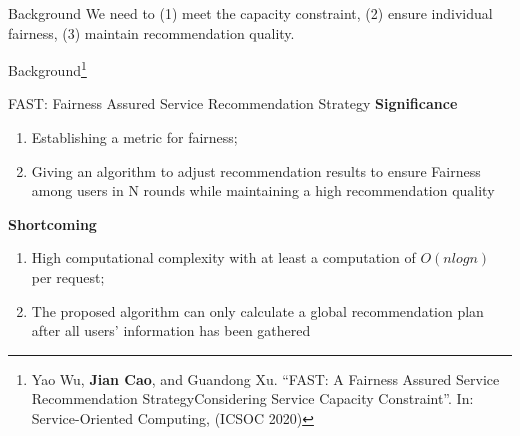 \begin{frame}{Background}
We need to (1) meet the capacity constraint, (2) ensure individual fairness, (3) maintain recommendation quality.

\end{frame}







\begin{frame}{Background\footnote{Yao Wu, \textbf{Jian Cao}, and Guandong Xu. “FAST: A Fairness Assured Service Recommendation StrategyConsidering Service Capacity Constraint”. In: Service-Oriented Computing, (ICSOC 2020)}}

\begin{block}{FAST: Fairness Assured Service Recommendation Strategy}
\textbf{Significance}
  \begin{enumerate}
      \item Establishing a metric for fairness;
      \item Giving an algorithm to adjust recommendation results to ensure Fairness among users in N rounds while maintaining a high recommendation quality
  \end{enumerate}


 \textbf{Shortcoming}
 \begin{enumerate}
     \item High computational complexity with at least a computation of
$O(n log n)$ per request;
     \item The proposed algorithm can only calculate a global recommendation plan
after all users’ information has been gathered
     
 \end{enumerate}
\end{block}

    
\end{frame}






